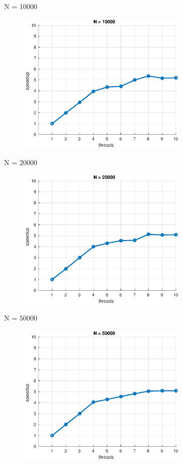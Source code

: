 \documentclass{beamer}
\begin{document}
\begin{frame}{N = 10000}

\begin{figure}[H]
\centering
\includegraphics[width=3.2in]{../Paper/fig/speedup10000.eps}
\end{figure}

\end{frame}


\begin{frame}{N = 20000}

\begin{figure}[H]
\centering
\includegraphics[width=3.2in]{../Paper/fig/speedup20000.eps}
\end{figure}

\end{frame}


\begin{frame}{N = 50000}

\begin{figure}[H]
\centering
\includegraphics[width=3.2in]{../Paper/fig/speedup50000.eps}
\end{figure}

\end{frame}
\end{document}

